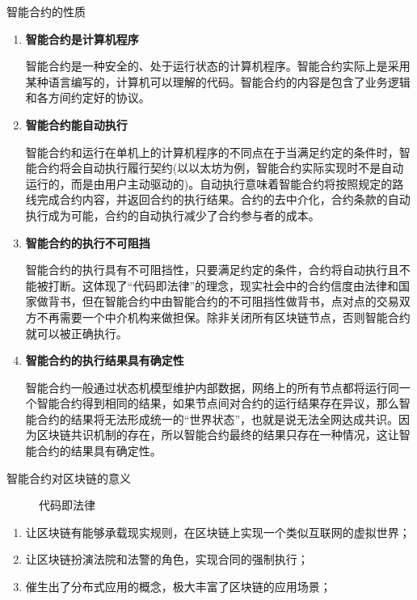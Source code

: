 \documentclass[11pt]{beamer}
\begin{document}
\begin{frame}{智能合约的性质}
	
	\begin{enumerate}
		\item \textbf{智能合约是计算机程序}
		
		{\tiny 智能合约是一种安全的、处于运行状态的计算机程序。智能合约实际上是采用某种语言编写的，计算机可以理解的代码。智能合约的内容是包含了业务逻辑和各方间约定好的协议。}
		
		\item \textbf{智能合约能自动执行}
		
			{\tiny  智能合约和运行在单机上的计算机程序的不同点在于当满足约定的条件时，智能合约将会自动执行履行契约(以以太坊为例，智能合约实际实现时不是自动运行的，而是由用户主动驱动的)。自动执行意味着智能合约将按照规定的路线完成合约内容，并返回合约的执行结果。合约的去中介化，合约条款的自动执行成为可能，合约的自动执行减少了合约参与者的成本。}
		
		\item \textbf{智能合约的执行不可阻挡}
		
			{\tiny  智能合约的执行具有不可阻挡性，只要满足约定的条件，合约将自动执行且不能被打断。这体现了“代码即法律”的理念，现实社会中的合约信度由法律和国家做背书，但在智能合约中由智能合约的不可阻挡性做背书，点对点的交易双方不再需要一个中介机构来做担保。除非关闭所有区块链节点，否则智能合约就可以被正确执行。}
		
		\item \textbf{智能合约的执行结果具有确定性}
		
			{\tiny  智能合约一般通过状态机模型维护内部数据，网络上的所有节点都将运行同一个智能合约得到相同的结果，如果节点间对合约的运行结果存在异议，那么智能合约的结果将无法形成统一的“世界状态”，也就是说无法全网达成共识。因为区块链共识机制的存在，所以智能合约最终的结果只存在一种情况，这让智能合约的结果具有确定性。}
	\end{enumerate}
\end{frame}

\begin{frame}{智能合约对区块链的意义}	
		\begin{figure}
			\centering
			\huge
			代码即法律
		\end{figure}
	\begin{enumerate}
		\item 让区块链有能够承载现实规则，在区块链上实现一个类似互联网的虚拟世界；
		\item 让区块链扮演法院和法警的角色，实现合同的强制执行；
		\item 催生出了分布式应用的概念，极大丰富了区块链的应用场景；
	\end{enumerate}
\end{frame}
\end{document}
